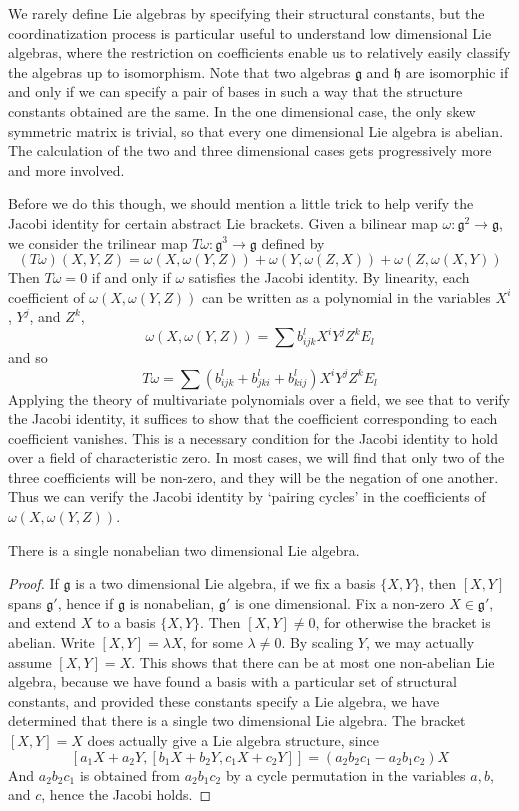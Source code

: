 We rarely define Lie algebras by specifying their structural constants, but the coordinatization process is particular useful to understand low dimensional Lie algebras, where the restriction on coefficients enable us to relatively easily classify the algebras up to isomorphism. Note that two algebras $\mathfrak{g}$ and $\mathfrak{h}$ are isomorphic if and only if we can specify a pair of bases in such a way that the structure constants obtained are the same. In the one dimensional case, the only skew symmetric matrix is trivial, so that every one dimensional Lie algebra is abelian. The calculation of the two and three dimensional cases gets progressively more and more involved.

Before we do this though, we should mention a little trick to help verify the Jacobi identity for certain abstract Lie brackets. Given a bilinear map $\omega: \mathfrak{g}^2 \to \mathfrak{g}$, we consider the trilinear map $T\omega: \mathfrak{g}^3 \to \mathfrak{g}$ defined by
%
\[ (T \omega)(X,Y,Z) = \omega(X, \omega(Y,Z)) + \omega(Y,\omega(Z,X)) + \omega(Z,\omega(X,Y)) \]
%
Then $T \omega = 0$ if and only if $\omega$ satisfies the Jacobi identity. By linearity, each coefficient of $\omega(X,\omega(Y,Z))$ can be written as a polynomial in the variables $X^i$, $Y^j$, and $Z^k$,
%
\[ \omega(X, \omega(Y,Z)) = \sum b_{ijk}^l X^i Y^j Z^k E_l \]
%
and so
%
\[ T\omega = \sum (b_{ijk}^l + b_{jki}^l + b_{kij}^l) X^i Y^j Z^k E_l \]
%
Applying the theory of multivariate polynomials over a field, we see that to verify the Jacobi identity, it suffices to show that the coefficient corresponding to each coefficient vanishes. This is a necessary condition for the Jacobi identity to hold over a field of characteristic zero. In most cases, we will find that only two of the three coefficients will be non-zero, and they will be the negation of one another. Thus we can verify the Jacobi identity by `pairing cycles' in the coefficients of $\omega(X,\omega(Y,Z))$.

\begin{theorem}
    There is a single nonabelian two dimensional Lie algebra.
\end{theorem}
\begin{proof}
    If $\mathfrak{g}$ is a two dimensional Lie algebra, if we fix a basis $\{ X,Y \}$, then $[X,Y]$ spans $\mathfrak{g}'$, hence if $\mathfrak{g}$ is nonabelian, $\mathfrak{g}'$ is one dimensional. Fix a non-zero $X \in \mathfrak{g}'$, and extend $X$ to a basis $\{ X, Y \}$. Then $[X,Y] \neq 0$, for otherwise the bracket is abelian. Write $[X,Y] = \lambda X$, for some $\lambda \neq 0$. By scaling $Y$, we may actually assume $[X,Y] = X$. This shows that there can be at most one non-abelian Lie algebra, because we have found a basis with a particular set of structural constants, and provided these constants specify a Lie algebra, we have determined that there is a single two dimensional Lie algebra. The bracket $[X,Y] = X$ does actually give a Lie algebra structure, since
    \[ [a_1X + a_2Y, [b_1X + b_2Y, c_1X + c_2Y]] = (a_2b_2c_1 - a_2b_1c_2) X \]
    And $a_2b_2c_1$ is obtained from $a_2b_1c_2$ by a cycle permutation in the variables $a,b$, and $c$, hence the Jacobi holds.
\end{proof}

